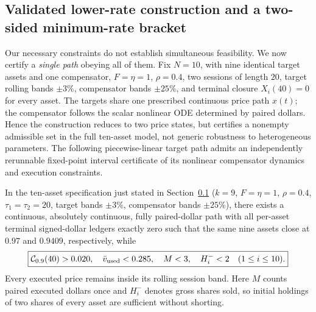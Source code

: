 \documentclass[review,hidelinks,onefignum,onetabnum]{siamonline250211}
\begin{document}
\subsection{Validated lower-rate construction and a two-sided minimum-rate bracket}\label{subsec:v7-certified}
Our necessary constraints do not establish simultaneous feasibility. We now certify a \emph{single path} obeying all of them. Fix $N=10$, with nine identical target assets and one compensator, $F=\eta=1$, $\rho=0.4$, two sessions of length $20$, target rolling bands $\pm3\%$, compensator bands $\pm25\%$, and terminal closure $X_i(40)=0$ for every asset. The targets share one prescribed continuous price path $x(t)$; the compensator follows the scalar nonlinear ODE determined by paired dollars. Hence the construction reduces to two price states, but certifies a nonempty admissible set in the full ten-asset model, not generic robustness to heterogeneous parameters. The following piecewise-linear target path admits an independently rerunnable fixed-point interval certificate of its nonlinear compensator dynamics and execution constraints.
\begin{proposition}\label{prop:certified-v7}
In the ten-asset specification just stated in Section~\ref{subsec:v7-certified} ($k=9$, $F=\eta=1$, $\rho=0.4$, $\tau_1=\tau_2=20$, target bands $\pm3\%$, compensator bands $\pm25\%$), there exists a continuous, absolutely continuous, fully paired-dollar path with all per-asset terminal signed-dollar ledgers exactly zero such that the same nine assets close at $0.97$ and $0.9409$, respectively, while
\begin{equation}\label{eq:v7-certified-result}
\boxed{\mathcal{C}_{0.9}(40)>0.020,\quad \bar v_{\mathrm{used}}<0.285,\quad M<3,\quad H_i^-<2\quad(1\le i\le10).}
\end{equation}
Every executed price remains inside its rolling session band. Here $M$ counts paired executed dollars once and $H_i^-$ denotes gross shares sold, so initial holdings of two shares of every asset are sufficient without shorting.
\end{proposition}
\end{document}
